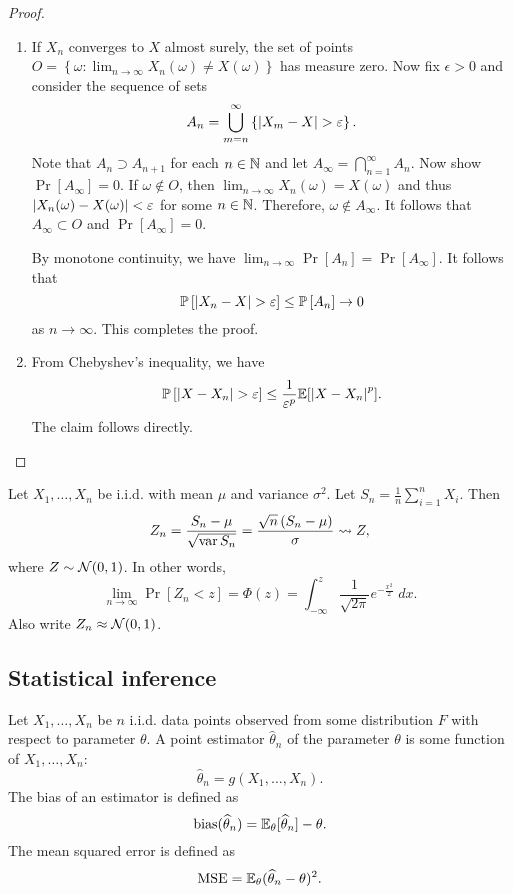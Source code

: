 \documentclass[a4paper]{article}
\begin{document}
\begin{proof}

\begin{enumerate}
  \item If $X_n$ converges to $X$ almost surely, 
  the set of points $O = \left\{ \omega : \lim_{n \to \infty}
  X_n(\omega) \neq X(\omega) \right\}$ has measure zero.
  Now fix $\epsilon > 0$ and consider the sequence of 
  sets 
  \[
  A_n = \bigcup_{m = n}^\infty \left\{ \left\lvert X_m - X\right\rvert > \varepsilon \right\}.
  \]
  Note that $A_n \supset A_{n+1}$ for each $n \in \mathbb{N}$ and 
  let $A_\infty = \bigcap_{n=1}^\infty A_n$. 
  Now show $\Pr[A_\infty] = 0$. If $\omega \notin O$, then 
  $\lim_{n \to \infty} X_n (\omega) = X(\omega)$ and thus 
  $\left\lvert X_n(\omega) - X(\omega)\right\rvert < \varepsilon$ for some $n \in \mathbb{N}$.
  Therefore, $\omega \notin A_\infty$.
  It follows that $A_\infty \subset O$ and $\Pr[A_\infty] = 0$. 
  
  By monotone 
  continuity, we have $\lim_{n \to \infty} \Pr[A_n] = 
  \Pr[A_\infty]$. It follows that
  \[
  \mathbb{P} \left[ \left\lvert X_n - X\right\rvert > \varepsilon \right] 
  \leq \mathbb{P} \left[ A_n \right] \to 0 
  \]
  as $n \to \infty$. This completes the proof.

  \item From Chebyshev's inequality, we have 
  \[
  \mathbb{P} \left[ \left\lvert X - X_n\right\rvert > \varepsilon \right] \leq 
  \frac{1}{\varepsilon^p} \mathbb{E} [\left\lvert X - X_n\right\rvert^p].
  \]
  The claim follows directly.
\end{enumerate}

\end{proof}

\begin{thm}
  Let $X_1, \dots, X_n$ be i.i.d. with mean $\mu$ and variance 
  $\sigma^2$. Let $S_n = \frac{1}{n} \sum_{i=1}^n X_i$.
  Then 
  \[
  Z_n = \frac{S_n - \mu}{\sqrt{\operatorname{var} S_n}}
  = \frac{\sqrt{n} \left( S_n - \mu \right)}{\sigma} 
  \rightsquigarrow Z,
  \]
  where $Z \sim \mathcal{N}(0, 1)$. In other words, 
  \[
  \lim_{n \to \infty} \Pr[Z_n < z] = \Phi(z) 
  = \int_{-\infty}^z \frac{1}{\sqrt{2\pi}} e^{- \frac{x^2}{2}} 
  \; dx.
  \]
  Also write $Z_n \approx \mathcal{N}(0, 1)$.
\end{thm}

\subsection{Statistical inference}

\begin{defi}
  Let $X_1, \dots, X_n$ be $n$ i.i.d. data points observed 
  from some distribution $F$ with respect to parameter 
  $\theta$. A point estimator $\hat{\theta}_n$ 
  of the parameter $\theta$ is some function of 
  $X_1, \dots, X_n$:
  \[
  \hat{\theta}_n = g(X_1, \dots, X_n).
  \]
  The bias of an estimator is defined as 
  \[
  \operatorname{bias} (\widehat{\theta}_n)  
  = \mathbb{E}_\theta [\widehat{\theta}_n] - \theta.
  \]
  The mean squared error is defined as 
  \[
  \operatorname{MSE} = \mathbb{E}_\theta (\widehat{\theta}_n - \theta)^2.
  \]
\end{defi}
\end{document}
